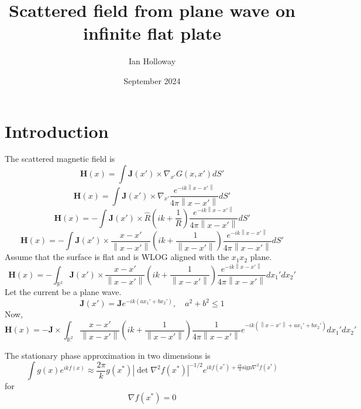 \documentclass{article}
\title{Scattered field from plane wave on infinite flat plate}
\author{Ian Holloway}
\date{September 2024}
\newcommand{\norm}[1]{\left\lVert #1 \right\rVert}
\newcommand{\abs}[1]{\left\lvert #1 \right\rvert}
\theoremstyle{plain}
\begin{document}
\maketitle

\section{Introduction}\label{sec_intro}

The scattered magnetic field is
\begin{equation}
	\mathbf{H}(x) = \int \mathbf{J}(x') \times \nabla_{x'} G(x,x') dS'
\end{equation}
\begin{equation}
	\mathbf{H}(x)
	= \int \mathbf{J}(x') \times \nabla_{x'} \frac{e^{-ik\norm{x-x'}}}{4\pi\norm{x-x'}} dS'
\end{equation}
\begin{equation}
	\mathbf{H}(x)
	= -\int \mathbf{J}(x') \times \hat{R} \left( ik + \frac{1}{R} \right) \frac{e^{-ik\norm{x-x'}}}{4\pi\norm{x-x'}} dS'
\end{equation}
\begin{equation}
	\mathbf{H}(x)
	= -\int \mathbf{J}(x') \times \frac{x-x'}{\norm{x-x'}}
	\left( ik + \frac{1}{\norm{x-x'}} \right)
	\frac{e^{-ik\norm{x-x'}}}{4\pi\norm{x-x'}} dS'
\end{equation}
Assume that the surface is flat and is WLOG aligned with the $x_1x_2$ plane.
\begin{equation}
	\mathbf{H}(x)
	= -\int_{\mathbb{R}^2} \mathbf{J}(x') \times \frac{x-x'}{\norm{x-x'}}
	\left( ik + \frac{1}{\norm{x-x'}} \right)
	\frac{e^{-ik\norm{x-x'}}}{4\pi\norm{x-x'}} dx_1'dx_2'
\end{equation}
Let the current be a plane wave.
\begin{equation}
	\mathbf{J}(x') = \mathbf{J}e^{-ik(ax_1' + bx_2')}, \quad a^2 + b^2 \leq 1
\end{equation}
Now,
\begin{equation}
	\mathbf{H}(x)
	= -\mathbf{J} \times \int_{\mathbb{R}^2}
	\frac{x-x'}{\norm{x-x'}}
	\left( ik + \frac{1}{\norm{x-x'}} \right)
	\frac{1}{4\pi\norm{x-x'}}
	e^{-ik\left( \norm{x-x'} + ax_1' + bx_2' \right)} dx_1'dx_2'
\end{equation}


The stationary phase approximation in two dimensions is
\begin{equation}
	\int g(x) e^{ikf(x)}
	\approx \frac{2\pi}{k} g(x^*)
	\abs{\det \nabla^2 f(x^*)}^{-1/2}
	e^{ikf(x^*) + \frac{i\pi}{4}\text{sign}\nabla^2 f(x^*)}
\end{equation}
for
\begin{equation}
	\nabla f(x^*) = 0
\end{equation}
\end{document}
